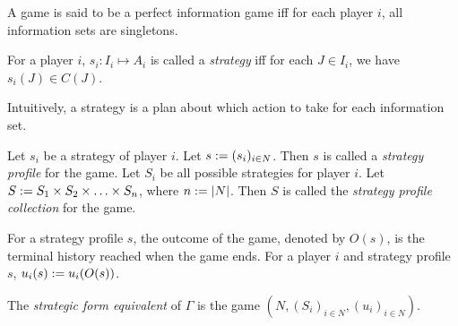 \begin{definition}
A game is said to be a perfect information game
iff for each player $i$, all information sets are singletons.
\end{definition}

\begin{definition}
For a player $i$, $s_i: I_i \mapsto A_i$ is called a \emph{strategy} iff
for each $J \in I_i$, we have $s_i(J) \in C(J)$.
\end{definition}
Intuitively, a strategy is a plan about which action to take for each information set.

\begin{definition}
Let $s_i$ be a strategy of player $i$.
Let $s := (s_i)_{i \in N}$.
Then $s$ is called a \emph{strategy profile} for the game.
Let $S_i$ be all possible strategies for player $i$.
Let $S := S_1 \times S_2 \times \ldots \times S_n$, where $n := |N|$.
Then $S$ is called the \emph{strategy profile collection} for the game.

For a strategy profile $s$, the outcome of the game, denoted by $O(s)$,
is the terminal history reached when the game ends.
For a player $i$ and strategy profile $s$, $u_i(s) := u_i(O(s))$.

The \emph{strategic form equivalent} of $\Gamma$
is the game $(N, (S_i)_{i \in N}, (u_i)_{i \in N})$.
\end{definition}



